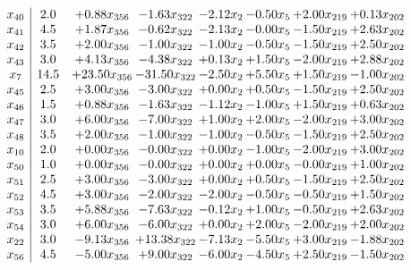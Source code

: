 \documentclass[8pt]{article}
\begin{document}
\[\begin{array}{c| c c@{\hskip 2pt} c@{\hskip 2pt} c@{\hskip 2pt} c@{\hskip 2pt} c@{\hskip 2pt} c@{\hskip 2pt} }
 x_{40}   &  2.0 & +  0.88 x_{356} & -1.63 x_{322} & -2.12 x_{2} & -0.50 x_{5} & +  2.00 x_{219} & +  0.13 x_{202}\\
 x_{41}   &  4.5 & +  1.87 x_{356} & -0.62 x_{322} & -2.13 x_{2} & -0.00 x_{5} & -1.50 x_{219} & +  2.63 x_{202}\\
 x_{42}   &  3.5 & +  2.00 x_{356} & -1.00 x_{322} & -1.00 x_{2} & -0.50 x_{5} & -1.50 x_{219} & +  2.50 x_{202}\\
 x_{43}   &  3.0 & +  4.13 x_{356} & -4.38 x_{322} & +  0.13 x_{2} & +  1.50 x_{5} & -2.00 x_{219} & +  2.88 x_{202}\\
 x_{7}   &  14.5 & + 23.50 x_{356} & -31.50 x_{322} & -2.50 x_{2} & +  5.50 x_{5} & +  1.50 x_{219} & -1.00 x_{202}\\
 x_{45}   &  2.5 & +  3.00 x_{356} & -3.00 x_{322} & +  0.00 x_{2} & +  0.50 x_{5} & -1.50 x_{219} & +  2.50 x_{202}\\
 x_{46}   &  1.5 & +  0.88 x_{356} & -1.63 x_{322} & -1.12 x_{2} & -1.00 x_{5} & +  1.50 x_{219} & +  0.63 x_{202}\\
 x_{47}   &  3.0 & +  6.00 x_{356} & -7.00 x_{322} & +  1.00 x_{2} & +  2.00 x_{5} & -2.00 x_{219} & +  3.00 x_{202}\\
 x_{48}   &  3.5 & +  2.00 x_{356} & -1.00 x_{322} & -1.00 x_{2} & -0.50 x_{5} & -1.50 x_{219} & +  2.50 x_{202}\\
 x_{10}   &  2.0 & +  0.00 x_{356} & -0.00 x_{322} & +  0.00 x_{2} & -1.00 x_{5} & -2.00 x_{219} & +  3.00 x_{202}\\
 x_{50}   &  1.0 & +  0.00 x_{356} & -0.00 x_{322} & +  0.00 x_{2} & +  0.00 x_{5} & -0.00 x_{219} & +  1.00 x_{202}\\
 x_{51}   &  2.5 & +  3.00 x_{356} & -3.00 x_{322} & +  0.00 x_{2} & +  0.50 x_{5} & -1.50 x_{219} & +  2.50 x_{202}\\
 x_{52}   &  4.5 & +  3.00 x_{356} & -2.00 x_{322} & -2.00 x_{2} & -0.50 x_{5} & -0.50 x_{219} & +  1.50 x_{202}\\
 x_{53}   &  3.5 & +  5.88 x_{356} & -7.63 x_{322} & -0.12 x_{2} & +  1.00 x_{5} & -0.50 x_{219} & +  2.63 x_{202}\\
 x_{54}   &  3.0 & +  6.00 x_{356} & -6.00 x_{322} & +  0.00 x_{2} & +  2.00 x_{5} & -2.00 x_{219} & +  2.00 x_{202}\\
 x_{22}   &  3.0 & -9.13 x_{356} & + 13.38 x_{322} & -7.13 x_{2} & -5.50 x_{5} & +  3.00 x_{219} & -1.88 x_{202}\\
 x_{56}   &  4.5 & -5.00 x_{356} & +  9.00 x_{322} & -6.00 x_{2} & -4.50 x_{5} & +  2.50 x_{219} & -1.50 x_{202}\\

\end{array}\]
\end{document}
